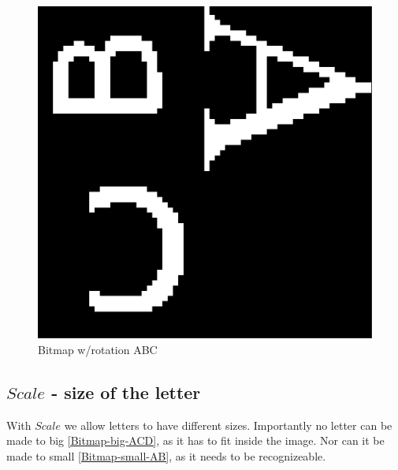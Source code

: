 \begin{figure}[h]
    \centering
    \includegraphics[scale=0.2]{figures/Bitmap-rot-ABC}
    \caption{Bitmap w/rotation ABC} 
    \label{Bitmap-rot-ABC}
\end{figure}

\subsection{$Scale$ - size of the letter}
With $Scale$ we allow letters to have different sizes. Importantly no letter can be made to big \ref{Bitmap-big-ACD}, as
it has to fit inside the image. Nor can it be made to small \ref{Bitmap-small-AB}, as it needs to be recognizeable. 

